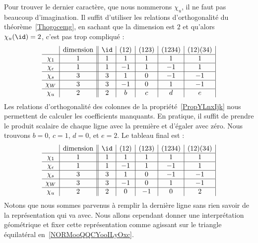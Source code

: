 Pour trouver le dernier caractère, que nous nommerons \( \chi_u\), il ne faut pas beaucoup d'imagination. Il suffit d'utiliser les relations d'orthogonalité du théorème~\ref{Thogocemg}, en sachant que la dimension est \( 2\) et qu'alors \( \chi_u(\id)=2\), c'est pas trop compliqué :
\begin{equation}    \label{EqOKtZYFQ}
	\begin{array}[]{c|c||c|c|c|c|c|}
		                & \text{dimension} & \id & (12) & (123) & (1234) & (12)(34) \\
		\hline
		\chi_1          & 1                & 1   & 1    & 1     & 1      & 1        \\
		\hline
		\chi_{\epsilon} & 1                & 1   & -1   & 1     & -1     & 1        \\
		\hline
		\chi_s          & 3                & 3   & 1    & 0     & -1     & -1       \\
		\hline
		\chi_W          & 3                & 3   & -1   & 0     & 1      & -1       \\
		\hline
		\chi_u          & 2                & 2   & b    & c     & d      & e        \\
	\end{array}
\end{equation}
Les relations d'orthogonalité des colonnes de la propriété~\ref{PropYLnxIjk} nous permettent de calculer les coefficients manquants. En pratique, il suffit de prendre le produit scalaire de chaque ligne avec la première et d'égaler avec zéro. Nous trouvons \( b=0\), \( c=1\), \( d=0\), et \( e=2\). Le tableau final est :
\begin{equation}
	\begin{array}[]{c|c||c|c|c|c|c|}
		                & \text{dimension} & \id & (12) & (123) & (1234) & (12)(34) \\
		\hline
		\chi_1          & 1                & 1   & 1    & 1     & 1      & 1        \\
		\hline
		\chi_{\epsilon} & 1                & 1   & -1   & 1     & -1     & 1        \\
		\hline
		\chi_s          & 3                & 3   & 1    & 0     & -1     & -1       \\
		\hline
		\chi_W          & 3                & 3   & -1   & 0     & 1      & -1       \\
		\hline
		\chi_u          & 2                & 2   & 0    & -1    & 0      & 2        \\
	\end{array}
\end{equation}
Notons que nous sommes parvenus à remplir la dernière ligne sans rien savoir de la représentation qui va avec. Nous allons cependant donner une interprétation géométrique et fixer cette représentation comme agissant sur le triangle équilatéral en~\ref{NORMooQQCYooILyOxc}.


